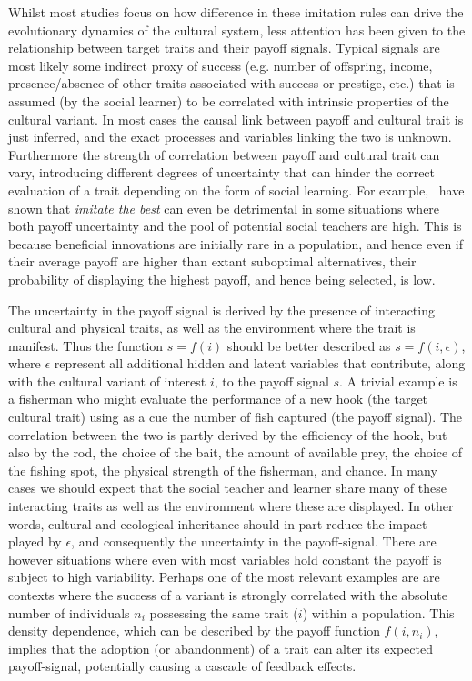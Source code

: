 \documentclass[review,authoryear]{elsarticle}
\begin{document}
Whilst most studies focus on how difference in these imitation rules can drive the evolutionary dynamics of the cultural system, less attention has been given to the relationship between target  traits and their payoff signals. Typical signals are most likely some indirect proxy of success (e.g. number of offspring, income, presence/absence of other traits associated with success or prestige, etc.)  that is assumed (by the social learner) to be correlated with intrinsic properties of the cultural variant. In most cases the causal link between  payoff and cultural trait is just inferred, and the exact processes and variables linking the two is unknown. Furthermore the strength of correlation between payoff and cultural trait can vary, introducing different degrees of uncertainty that can hinder the correct evaluation of a trait depending on the form of social learning. For example,~\citet{crema_lake_inpress} have shown that \emph{imitate the best} can even be detrimental in some situations where both payoff uncertainty  and the pool of potential social teachers are high.  This is because beneficial innovations are initially rare in a population, and hence even if their average payoff are higher than extant suboptimal alternatives, their probability of displaying the highest payoff, and hence being selected, is low.

The uncertainty in the payoff signal is derived by the presence of interacting cultural and physical traits, as well as the environment where the trait is manifest. Thus the function $s=f(i)$ should be better described as $s=f(i,\epsilon)$, where $\epsilon$ represent all additional hidden and latent variables that contribute, along with the cultural variant of interest $i$, to the payoff signal $s$. A trivial example is a fisherman who might evaluate the performance of a new hook (the target cultural trait) using as a cue the number of fish captured (the payoff signal). The correlation between the two is partly derived by the efficiency of the hook, but also by the rod, the choice of the bait, the amount of available prey, the choice of the fishing spot, the physical strength of the fisherman, and chance. In many cases we should expect that the social teacher and learner share many of these interacting traits as well as the environment where these are displayed. In other words, cultural and ecological inheritance should in part reduce the impact played by $\epsilon$, and consequently the uncertainty in the payoff-signal. There are however situations where even with most variables hold constant the payoff is subject to high variability. Perhaps one of the most relevant examples are 
are contexts where the success of a variant is strongly correlated with the absolute number of individuals $n_i$ possessing the same trait ($i$) within a population. This density dependence, which can be described by the payoff function $f(i,n_i)$, implies that the adoption (or abandonment) of a trait can alter its expected payoff-signal, potentially causing a cascade of feedback effects.  
\end{document}
